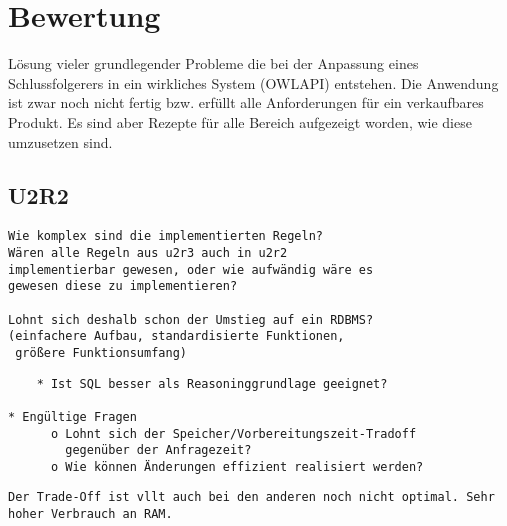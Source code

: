 \chapter{Bewertung}

Lösung vieler grundlegender Probleme die bei der Anpassung eines Schlussfolgerers in ein wirkliches System (OWLAPI) entstehen. Die Anwendung ist zwar noch nicht fertig bzw. erfüllt alle Anforderungen für ein verkaufbares Produkt. Es sind aber Rezepte für alle Bereich aufgezeigt worden, wie diese umzusetzen sind.

\section{U2R2}
\begin{verbatim} 
Wie komplex sind die implementierten Regeln?
Wären alle Regeln aus u2r3 auch in u2r2
implementierbar gewesen, oder wie aufwändig wäre es
gewesen diese zu implementieren?

Lohnt sich deshalb schon der Umstieg auf ein RDBMS?
(einfachere Aufbau, standardisierte Funktionen,
 größere Funktionsumfang) 
\end{verbatim}

\begin{verbatim}
    * Ist SQL besser als Reasoninggrundlage geeignet?

* Engültige Fragen
      o Lohnt sich der Speicher/Vorbereitungszeit-Tradoff
        gegenüber der Anfragezeit?
      o Wie können Änderungen effizient realisiert werden? 
\end{verbatim}

\begin{verbatim}
Der Trade-Off ist vllt auch bei den anderen noch nicht optimal. Sehr hoher Verbrauch an RAM.
\end{verbatim}